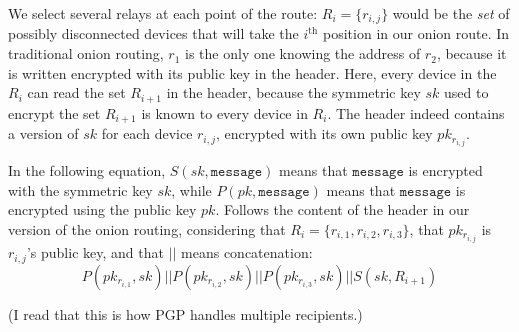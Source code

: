 We select several relays at each point of the route: $R_i=\{r_{i,j}\}$ would be the \emph{set} of possibly disconnected devices that will take the $i^\text{th}$ position in our onion route.
In traditional onion routing, $r_1$ is the only one knowing the address of $r_2$, because it is written encrypted with its public key in the header.
Here, every device in the $R_i$ can read the set $R_{i+1}$ in the header, because the symmetric key $sk$ used to encrypt the set $R_{i+1}$ is known to every device in $R_i$.
The header indeed contains a version of $sk$ for each device $r_{i,j}$, encrypted with its own public key $pk_{r_{i,j}}$.

In the following equation, $S(sk,\texttt{message})$ means that $\texttt{message}$ is encrypted with the symmetric key $sk$, while $P(pk, \texttt{message})$ means that $\texttt{message}$ is encrypted using the public key $pk$.
Follows the content of the header in our version of the onion routing, considering that $R_i=\{r_{i,1}, r_{i,2}, r_{i,3}\}$, that $pk_{r_{i,j}}$ is $r_{i,j}$'s public key, and that $||$ means concatenation:
\[
  P(pk_{r_{i,1}}, sk) || P(pk_{r_{i,2}}, sk) || P(pk_{r_{i,3}}, sk) || S(sk, 
  R_{i+1})
\]

(I read that this is how PGP handles multiple recipients.)







